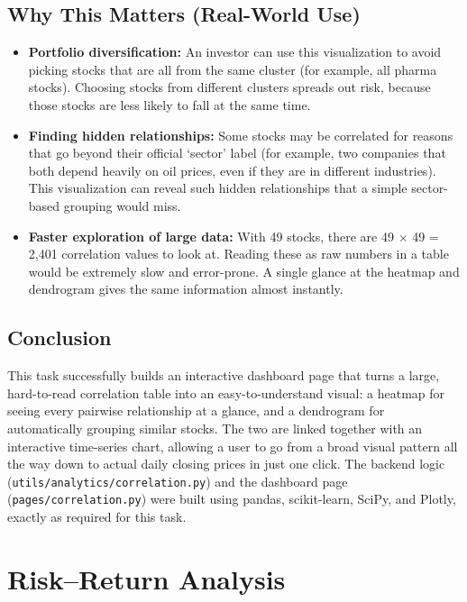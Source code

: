 \documentclass[14pt,a4paper]{extreport}
\begin{document}
\subsection{Why This Matters (Real-World Use)}
\begin{itemize}
    \item \textbf{Portfolio diversification:} An investor can use this
        visualization to avoid picking stocks that are all from the same
        cluster (for example, all pharma stocks). Choosing stocks from
        different clusters spreads out risk, because those stocks are
        less likely to fall at the same time.
    \item \textbf{Finding hidden relationships:} Some stocks may be
        correlated for reasons that go beyond their official `sector'
        label (for example, two companies that both depend heavily on
        oil prices, even if they are in different industries). This
        visualization can reveal such hidden relationships that a simple
        sector-based grouping would miss.
    \item \textbf{Faster exploration of large data:} With 49 stocks,
        there are 49 $\times$ 49 = 2,401 correlation values to look at.
        Reading these as raw numbers in a table would be extremely slow
        and error-prone. A single glance at the heatmap and dendrogram
        gives the same information almost instantly.
\end{itemize}

\subsection{Conclusion}
This task successfully builds an interactive dashboard page that turns a
large, hard-to-read correlation table into an easy-to-understand visual: a
heatmap for seeing every pairwise relationship at a glance, and a
dendrogram for automatically grouping similar stocks. The two are linked
together with an interactive time-series chart, allowing a user to go from
a broad visual pattern all the way down to actual daily closing prices in
just one click. The backend logic (\texttt{utils/analytics/correlation.py})
and the dashboard page (\texttt{pages/correlation.py}) were built using
pandas, scikit-learn, SciPy, and Plotly, exactly as required for this task.

\section{Risk--Return Analysis}
\end{document}
